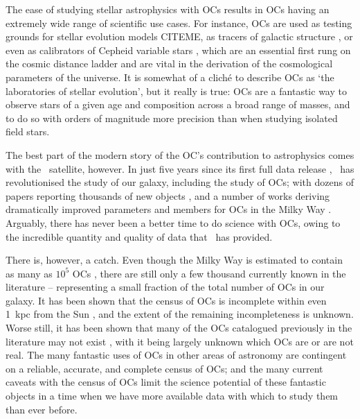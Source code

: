 The ease of studying stellar astrophysics with OCs results in OCs having an extremely wide range of scientific use cases. For instance, OCs are used as testing grounds for stellar evolution models CITEME, as tracers of galactic structure \citep{cantat-gaudin_painting_2020,castro-ginard_milky_2021}, or even as calibrators of Cepheid variable stars \citep{medina_revisited_2021}, which are an essential first rung on the cosmic distance ladder and are vital in the derivation of the cosmological parameters of the universe. It is somewhat of a cliché to describe OCs as `the laboratories of stellar evolution', but it really is true: OCs are a fantastic way to observe stars of a given age and composition across a broad range of masses, and to do so with orders of magnitude more precision than when studying isolated field stars.

The best part of the modern story of the OC's contribution to astrophysics comes with the \gaia\ satellite, however. In just five years since its first full data release \citep{brown_gaia_2018}, \gaia\ has revolutionised the study of our galaxy, including the study of OCs; with dozens of papers reporting thousands of new objects \citep[e.g.][]{liu_catalog_2019,castro-ginard_hunting_2019,castro-ginard_hunting_2020,castro-ginard_hunting_2022}, and a number of works deriving dramatically improved parameters and members for OCs in the Milky Way \citep[e.g.][]{cantat-gaudin_gaia_2018,tarricq_3d_2020}. Arguably, there has never been a better time to do science with OCs, owing to the incredible quantity and quality of data that \gaia\ has provided.

There is, however, a catch. Even though the Milky Way is estimated to contain as many as $10^5$ OCs \citep{dias_new_2002}, there are still only a few thousand currently known in the literature -- representing a small fraction of the total number of OCs in our galaxy. It has been shown that the census of OCs is incomplete within even 1~kpc from the Sun \citep[e.g.][]{castro-ginard_new_2018}, and the extent of the remaining incompleteness is unknown. Worse still, it has been shown that many of the OCs catalogued previously in the literature may not exist \citep{cantat-gaudin_clusters_2020,piatti_catching_2023}, with it being largely unknown which OCs are or are not real. The many fantastic uses of OCs in other areas of astronomy are contingent on a reliable, accurate, and complete census of OCs; and the many current caveats with the census of OCs limit the science potential of these fantastic objects in a time when we have more available data with which to study them than ever before.

